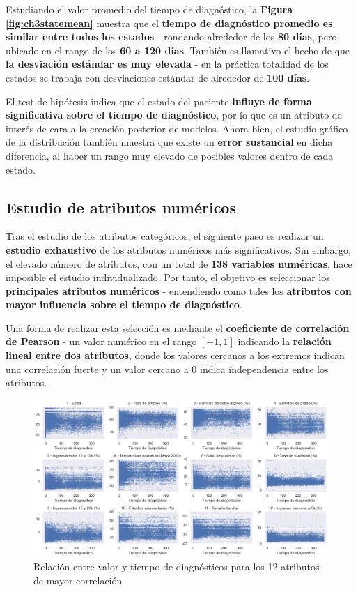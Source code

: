 Estudiando el valor promedio del tiempo de diagnóstico, la \textbf{Figura \ref{fig:ch3statemean}} muestra que el \textbf{tiempo de diagnóstico promedio es similar entre todos los estados} - rondando alrededor de los \textbf{80 días}, pero ubicado en el rango de los \textbf{60 a 120 días}. También es llamativo el hecho de que \textbf{la desviación estándar es muy elevada} - en la práctica totalidad de los estados se trabaja con desviaciones estándar de alrededor de \textbf{100 días}.

El test de hipótesis indica que el estado del paciente \textbf{influye de forma significativa sobre el tiempo de diagnóstico}, por lo que es un atributo de interés de cara a la creación posterior de modelos. Ahora bien, el estudio gráfico de la distribución también muestra que existe un \textbf{error sustancial} en dicha diferencia, al haber un rango muy elevado de posibles valores dentro de cada estado.

\subsection{Estudio de atributos numéricos}

Tras el estudio de los atributos categóricos, el siguiente paso es realizar un \textbf{estudio exhaustivo} de los atributos numéricos más significativos. Sin embargo, el elevado número de atributos, con un total de \textbf{138 variables numéricas}, hace imposible el estudio individualizado. Por tanto, el objetivo es seleccionar los \textbf{principales atributos numéricos} - entendiendo como tales los \textbf{atributos con mayor influencia sobre el tiempo de diagnóstico}. 

Una forma de realizar esta selección es mediante el \textbf{coeficiente de correlación de Pearson} - un valor numérico en el rango $[-1, 1]$ indicando la \textbf{relación lineal entre dos atributos}, donde los valores cercanos a los extremos indican una correlación fuerte y un valor cercano a $0$ indica independencia entre los atributos.

\begin{figure}[h]
	\centering
	\includegraphics[width=1\linewidth]{figs/chapter3/numerical/correlations.png}
	\captionsetup{belowskip=-15pt, justification=centering}
	\caption{Relación entre valor y tiempo de diagnósticos para los 12 atributos de mayor correlación}
	\label{fig:ch3correlations}
\end{figure}

